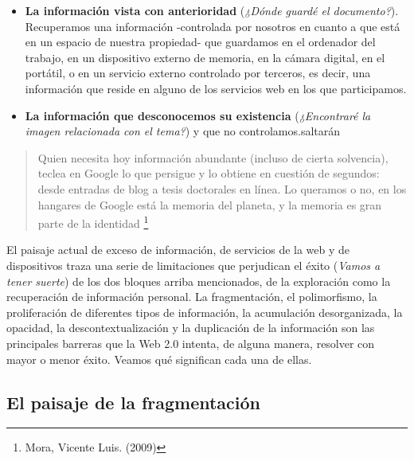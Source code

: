 \documentclass[12pt, a4paper,twoside]{book}
\begin{document}
\begin{itemize}
\item
  \textbf{La información vista con anterioridad}
  (\emph{¿Dónde guardé el documento?}). Recuperamos una información
  -controlada por nosotros en cuanto a que está en un espacio de
  nuestra propiedad- que guardamos en el ordenador del trabajo, en un
  dispositivo externo de memoria, en la cámara digital, en el
  portátil, o en un servicio externo controlado por terceros, es
  decir, una información que reside en alguno de los servicios web en
  los que participamos.
\item
  \textbf{La información que desconocemos su existencia}
  (\emph{¿Encontraré la imagen relacionada con el tema?}) y que no
  controlamos.saltarán
\end{itemize}
\begin{quote}
Quien necesita hoy información abundante (incluso de cierta
solvencia), teclea en Google lo que persigue y lo obtiene en
cuestión de segundos: desde entradas de blog a tesis doctorales en
línea. Lo queramos o no, en los hangares de Google está la memoria
del planeta, y la memoria es gran parte de la identidad%
\footnote{Mora, Vicente Luis. (2009)}

\end{quote}
El paisaje actual de exceso de información, de servicios de la web
y de dispositivos traza una serie de limitaciones que perjudican el
éxito (\emph{Vamos a tener suerte}) de los dos bloques arriba
mencionados, de la exploración como la recuperación de información
personal. La fragmentación, el polimorfismo, la proliferación de
diferentes tipos de información, la acumulación desorganizada, la
opacidad, la descontextualización y la duplicación de la
información son las principales barreras que la Web 2.0 intenta, de
alguna manera, resolver con mayor o menor éxito. Veamos qué
significan cada una de ellas.

\subsection{El paisaje de la fragmentación}
\end{document}
